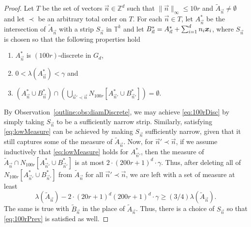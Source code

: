 \documentclass[12pt,a4paper]{amsart}
\numberwithin{equation}{section}
\theoremstyle{definition}
\begin{document}
\begin{proof}
Let $T$ be the set of vectors $\vec{n}\in\mathbb{Z}^d$ such that $\|\vec{n}\|_\infty\leq 10r$ and $\widetilde{A}_{\vec{n}}\neq \emptyset$ and let $\prec$ be an arbitrary total order on $T$. For each $\vec{n}\in T$, let $A^*_{\vec{n}}$ be the intersection of $\widetilde{A}_{\vec{n}}$ with a strip $S_{\vec{n}}$ in $\mathbb{T}^k$ and let $B^*_{\vec{n}} = A^*_{\vec{n}} + \sum_{i=1}^dn_i\boldsymbol{x}_i$, where $S_{\vec{n}}$ is chosen so that the following properties hold
\begin{enumerate}
\item\label{eq:100rDisc} $A^*_{\vec{n}}$ is $(100r)$-discrete in $G_d$,
\item\label{eq:lowMeasure} $0<\lambda(A^*_{\vec{n}})<\gamma$ and
\item\label{eq:100rPrev} $\left(A^*_{\vec{n}}\cup B^*_{\vec{n}}\right)\cap \left(\bigcup_{\vec{n}'\prec \vec{n}} N_{100r}\left[A^*_{\vec{n}'}\cup B^*_{\vec{n}'}\right]\right)=\emptyset$.
\end{enumerate}
By Observation~\ref{outline:obs:diamDiscrete}, we may achieve \eqref{eq:100rDisc} by simply taking $S_{\vec{n}}$ to be a sufficiently narrow strip. Similarly, satisfying \eqref{eq:lowMeasure} can be achieved by making $S_{\vec{n}}$ sufficiently narrow, given that it still captures some of the measure of $\widetilde{A}_{\vec{n}}$.  Now, for $\vec{n}'\prec \vec{n}$, if we assume  inductively that \eqref{eq:lowMeasure} holds for $A_{\vec{n}'}^*$, then the measure of $\widetilde{A}_{\vec{n}}\cap  N_{100r}\left[A^*_{\vec{n}'}\cup B^*_{\vec{n}'}\right]$ is at most $2\cdot (200r+1)^d\cdot \gamma$. Thus, after deleting all of  $N_{100r}\left[A^*_{\vec{n}'}\cup B^*_{\vec{n}'}\right]$ from $\widetilde{A}_{\vec{n}}$ for all $\vec{n}'\prec \vec{n}$, we are left with a set of measure at least
\[\lambda(\widetilde{A}_{\vec{n}}) - 2\cdot (20r+1)^d(200r+1)^d\cdot \gamma \geq (3/4)\lambda(\widetilde{A}_{\vec{n}}).\]
The same is true with $\widetilde{B}_{\vec{n}}$ in the place of $\widetilde{A}_{\vec{n}}$. Thus, there is a choice of $S_{\vec{n}}$ so that \eqref{eq:100rPrev} is satisfied as well. 


\end{proof}
\end{document}
